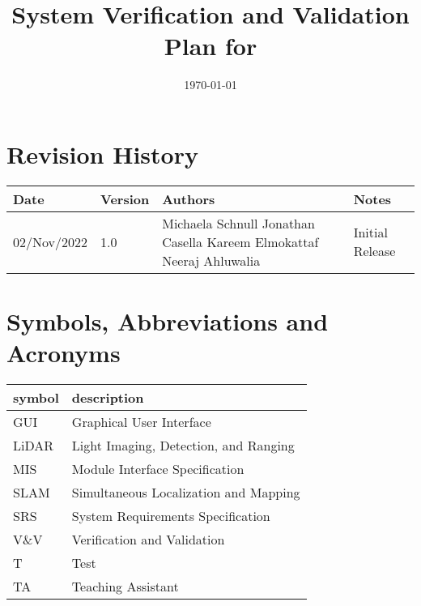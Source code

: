 \documentclass[12pt, titlepage]{article}
\begin{document}
\title{System Verification and Validation Plan for \progname{}} 
\author{\authname}
\date{\today}
	
\maketitle


\section{Revision History}

\begin{tabularx}{\textwidth}{p{3cm}p{2cm}p{4cm}X}
\toprule {\bf Date} & {\bf Version} & {\bf Authors} & {\bf Notes}\\
\midrule
02/Nov/2022 & 1.0 & Michaela Schnull \newline Jonathan Casella \newline Kareem Elmokattaf \newline Neeraj Ahluwalia & Initial Release\\
\bottomrule
\end{tabularx}

\newpage

\tableofcontents

\listoftables
{}

\listoffigures
{}

\newpage

\section{Symbols, Abbreviations and Acronyms}

\renewcommand{\arraystretch}{1.2}
\begin{tabular}{l l} 
  \toprule		
  \textbf{symbol} & \textbf{description}\\
  \midrule 
  GUI & Graphical User Interface\\
  LiDAR & Light Imaging, Detection, and Ranging\\
  MIS & Module Interface Specification\\
  SLAM & Simultaneous Localization and Mapping\\
  SRS & System Requirements Specification\\
  V\&V & Verification and Validation\\
  T & Test\\
  TA & Teaching Assistant\\
  \bottomrule
\end{tabular}\\
\end{document}

